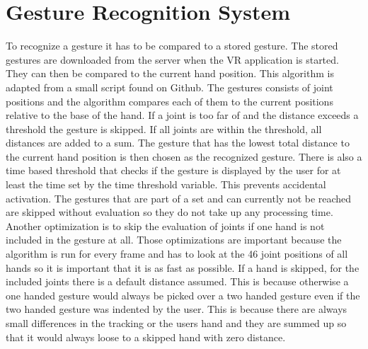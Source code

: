 


\section{Gesture Recognition System}
To recognize a gesture it has to be compared to a stored gesture. The stored gestures are downloaded from the server when the VR application is started. They can then be compared to the current hand position. This algorithm is adapted from a small script found on Github.  %
The gestures consists of joint positions and the algorithm compares each of them to the current positions relative to the base of the hand. If a joint is too far of and the distance exceeds a threshold the gesture is skipped. If all joints are within the threshold, all distances are added to a sum. The gesture that has the lowest total distance to the current hand position is then chosen as the recognized gesture. There is also a time based threshold that checks if the gesture is displayed by the user for at least the time set by the time threshold variable. This prevents accidental activation. The gestures that are part of a set and can currently not be reached are skipped without evaluation so they do not take up any processing time. Another optimization is to skip the evaluation of joints if one hand is not included in the gesture at all. Those optimizations are important because the algorithm is run for every frame and has to look at the 46 joint positions of all hands so it is important that it is as fast as possible.
If a hand is skipped, for the included joints there is a default distance assumed. This is because otherwise a one handed gesture would always be picked over a two handed gesture even if the two handed gesture was indented by the user. This is because there are always small differences in the tracking or the users hand and they are summed up so that it would always loose to a skipped hand with zero distance. 
